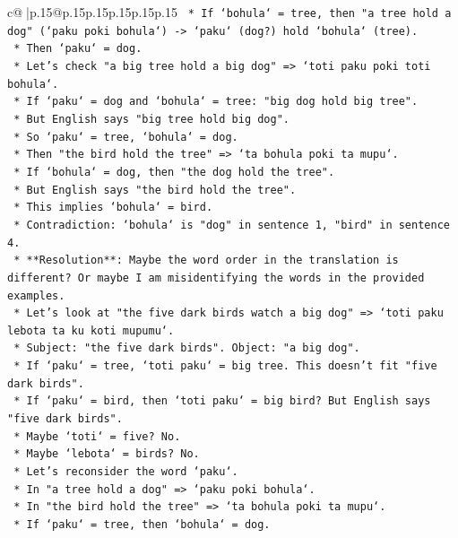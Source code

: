 \documentclass{article}
\begin{document}
{\begin{supertabular}{c@{$\;$}|p{.15\linewidth}@{}p{.15\linewidth}p{.15\linewidth}p{.15\linewidth}p{.15\linewidth}p{.15\linewidth}}
{{{\texttt{        *   If `bohula` = tree, then "a tree hold a dog" (`paku poki bohula`) {-}> `paku` (dog?) hold `bohula` (tree).} \\
\texttt{        *   Then `paku` = dog.} \\
\texttt{        *   Let's check "a big tree hold a big dog" => `toti paku poki toti bohula`.} \\
\texttt{        *   If `paku` = dog and `bohula` = tree: "big dog hold big tree".} \\
\texttt{        *   But English says "big tree hold big dog".} \\
\texttt{        *   So `paku` = tree, `bohula` = dog.} \\
\texttt{        *   Then "the bird hold the tree" => `ta bohula poki ta mupu`.} \\
\texttt{        *   If `bohula` = dog, then "the dog hold the tree".} \\
\texttt{        *   But English says "the bird hold the tree".} \\
\texttt{        *   This implies `bohula` = bird.} \\
\texttt{        *   Contradiction: `bohula` is "dog" in sentence 1, "bird" in sentence 4.} \\
\texttt{    *   **Resolution**: Maybe the word order in the translation is different? Or maybe I am misidentifying the words in the provided examples.} \\
\texttt{    *   Let's look at "the five dark birds watch a big dog" => `toti paku lebota ta ku koti mupumu`.} \\
\texttt{        *   Subject: "the five dark birds". Object: "a big dog".} \\
\texttt{        *   If `paku` = tree, `toti paku` = big tree. This doesn't fit "five dark birds".} \\
\texttt{        *   If `paku` = bird, then `toti paku` = big bird? But English says "five dark birds".} \\
\texttt{        *   Maybe `toti` = five? No.} \\
\texttt{        *   Maybe `lebota` = birds? No.} \\
\texttt{        *   Let's reconsider the word `paku`.} \\
\texttt{        *   In "a tree hold a dog" => `paku poki bohula`.} \\
\texttt{        *   In "the bird hold the tree" => `ta bohula poki ta mupu`.} \\
\texttt{        *   If `paku` = tree, then `bohula` = dog.} \\
}}}
\end{supertabular}}
\end{document}
